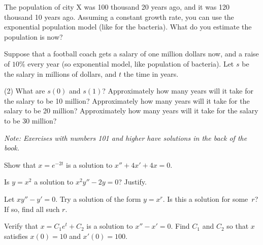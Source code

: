 \begin{exercise}
The population of city X was 100 thousand 20 years ago, and
it was 120 thousand 10 years ago.  Assuming a constant
growth rate, you can use the exponential population model
(like for the bacteria).  What do you estimate the population is now?
\end{exercise}

\begin{exercise}
Suppose that a football coach gets a salary of
one million dollars now, and a raise of $10\%$ every year
(so exponential model, like population of bacteria).
Let $s$ be the salary in millions of dollars, and $t$ the time in years.
\begin{tasks}(2)
\task
What are $s(0)$ and $s(1)$?
\task
Approximately how many years will it take for the salary to be 10 million?
\task
Approximately how many years will it take for the salary to be 20 million?
\task
Approximately how many years will it take for the salary to be 30 million?
\end{tasks}
\end{exercise}


\noindent
\emph{Note: Exercises with numbers 101 and higher have solutions in the
back of the book.}


\setcounter{exercise}{100}

\begin{exercise}
Show that $x = e^{-2t}$ is a solution to $x'' + 4x' + 4x = 0$.
\end{exercise}

\begin{exercise}
Is $y = x^2$ a solution to $x^2y'' - 2y = 0$?  Justify.
\end{exercise}

\begin{exercise}
Let $xy'' - y' = 0$.  Try a solution of the form $y = x^r$.  Is this a
solution for some~$r$?  If so, find all such $r$.
\end{exercise}


\begin{exercise}
Verify that $x=C_1e^t+C_2$ is a solution to $x''-x' = 0$.  Find $C_1$ and
$C_2$ so that $x$ satisfies $x(0) = 10$ and $x'(0) = 100$.
\end{exercise}

